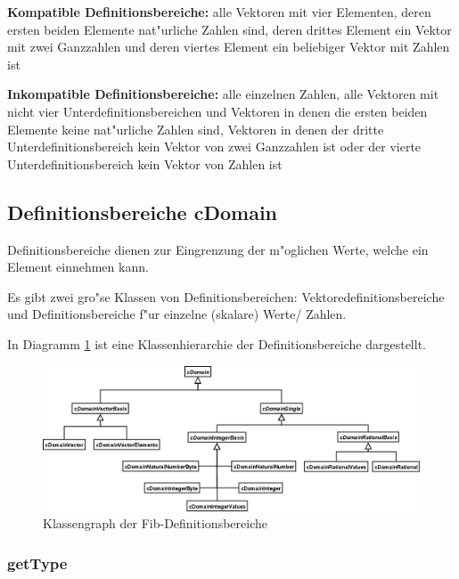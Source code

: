 \bigskip\noindent
\textbf{Kompatible Definitionsbereiche:} alle Vektoren mit vier Elementen, deren ersten beiden Elemente nat"urliche Zahlen sind, deren drittes Element ein Vektor mit zwei Ganzzahlen und deren viertes Element ein beliebiger Vektor mit Zahlen ist

\bigskip\noindent
\textbf{Inkompatible Definitionsbereiche:} alle einzelnen Zahlen, alle Vektoren mit nicht vier Unterdefinitionsbereichen und Vektoren in denen die ersten beiden Elemente keine nat"urliche Zahlen sind, Vektoren in denen der dritte Unterdefinitionsbereich kein Vektor von zwei Ganzzahlen ist oder der vierte Unterdefinitionsbereich kein Vektor von Zahlen ist



\subsection{Definitionsbereiche cDomain}

Definitionsbereiche dienen zur Eingrenzung der m"oglichen Werte, welche ein Element einnehmen kann.

Es gibt zwei gro"se Klassen von Definitionsbereichen: Vektoredefinitionsbereiche und Definitionsbereiche f"ur einzelne (skalare) Werte/ Zahlen.

In Diagramm \ref{figClassFibDomains} ist eine Klassenhierarchie der Definitionsbereiche dargestellt.

\begin{figure}[htbp]
\begin{center}
  \includegraphics[scale=0.25]{fib_definition_areas}
\end{center}
\caption{Klassengraph der Fib-Definitionsbereiche}
\label{figClassFibDomains}
\end{figure}


\subsubsection{getType}

